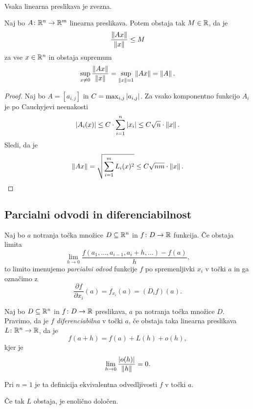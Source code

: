 \begin{posledica}
Vsaka linearna preslikava je zvezna.
\end{posledica}

\begin{trditev}
Naj bo $A\colon\mathbb{R}^n\to\mathbb{R}^m$ linearna preslikava. Potem obstaja tak $M\in\mathbb{R}$, da je
\[
\frac{\left\lVert Ax\right\rVert}{\left\lVert x\right\rVert}\leq M
\]
za vse $x\in\mathbb{R}^n$ in obstaja supremum
\[
\sup_{x\ne 0}\frac{\left\lVert Ax\right\rVert}{\left\lVert x\right\rVert}=\sup_{\left\lVert x\right\rVert=1}\left\lVert Ax\right\rVert=\left\lVert A\right\rVert.
\]
\end{trditev}

\begin{proof}
Naj bo $A=[a_{i,j}]$ in $C=\max_{i,j}\left\lvert a_{i,j}\right\rvert$. Za vsako komponentno funkcijo $A_i$ je po Cauchyjevi neenakosti
\[
\left\lvert A_i(x)\right\rvert\leq C\cdot\sum_{i=1}^n \left\lvert x_i\right\rvert\leq C\sqrt{n}\cdot \left\lVert x\right\rVert.
\]
Sledi, da je
\[
\left\lVert Ax\right\rVert=\sqrt{\sum_{i=1}^m L_i(x)^2}\leq C\sqrt{nm}\cdot\left\lVert x\right\rVert.\qedhere
\]
\end{proof}

\newpage

\subsection{Parcialni odvodi in diferenciabilnost}

\begin{definicija}
Naj bo $a$ notranja točka množice $D\subseteq\mathbb{R}^n$ in $f\colon D\to\mathbb{R}$ funkcija. Če obstaja limita
\[
\lim_{h\to 0}\frac{f(a_1,\dots,a_{i-1},a_i+h,\dots)-f(a)}{h},
\]
to limito imenujemo \emph{parcialni odvod} funkcije $f$ po spremenljivki $x_i$ v točki $a$ in ga označimo z
\[
\frac{\partial f}{\partial x_i}(a)=f_{x_i}(a)=(D_if)(a).
\]
\end{definicija}

\begin{definicija}
Naj bo $D\subseteq\mathbb{R}^n$ in $f\colon D\to\mathbb{R}$ preslikava, $a$ pa notranja točka množice $D$. Pravimo, da je $f$ \emph{diferenciabilna} v točki $a$, če obstaja taka linearna preslikava $L\colon\mathbb{R}^n\to\mathbb{R}$, da je
\[
f(a+h)=f(a)+L(h)+o(h),
\]
kjer je
\[
\lim_{h\to 0}\frac{\left\lvert o(h)\right\rvert}{\left\lVert h\right\rVert}=0.
\]
\end{definicija}

\begin{opomba}
Pri $n=1$ je ta definicija ekvivalentna odvedljivosti $f$ v točki $a$.
\end{opomba}

\begin{trditev}
Če tak $L$ obstaja, je enolično določen.
\end{trditev}

